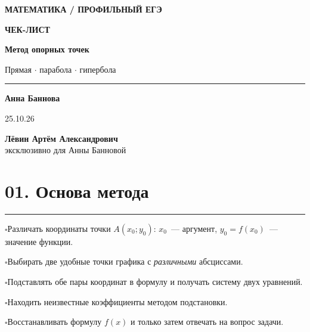 \documentclass[a4paper,12pt]{article}
\newcommand{\checkitem}{\(\square\)\enspace}
\newcommand{\sectionline}{\par\vspace{-4pt}\noindent\textcolor{accent}{\rule{\linewidth}{0.55pt}}\par\vspace{3pt}}
\begin{document}
\thispagestyle{empty}
\begin{center}
\vspace*{23mm}
{\large\textcolor{accent}{\textbf{МАТЕМАТИКА / ПРОФИЛЬНЫЙ ЕГЭ}}}\par\vspace{22mm}
{\fontsize{33}{39}\selectfont\bfseries ЧЕК-ЛИСТ}\par\vspace{11mm}
{\fontsize{22}{28}\selectfont\bfseries Метод опорных точек}\par\vspace{5mm}
{\large Прямая \(\cdot\) парабола \(\cdot\) гипербола}\par
\vspace{19mm}
\textcolor{accent}{\rule{0.58\linewidth}{0.7pt}}\par\vspace{16mm}
{\large\bfseries Анна Баннова}\par\vspace{4mm}
{\normalsize 25.10.26}\par\vspace{11mm}
{\normalsize\textbf{Лёвин Артём Александрович}\\[2mm]
эксклюзивно для Анны Банновой}
\end{center}
\vfill
\begin{center}
\end{center}
\clearpage

\section*{01. Основа метода}
\sectionline
\checkitem Различать координаты точки \(A(x_0;y_0)\): \(x_0\)~--- аргумент, \(y_0=f(x_0)\)~--- значение функции.\par
\checkitem Выбирать две удобные точки графика с \emph{различными} абсциссами.\par
\checkitem Подставлять обе пары координат в формулу и получать систему двух уравнений.\par
\checkitem Находить неизвестные коэффициенты методом подстановки.\par
\checkitem Восстанавливать формулу \(f(x)\) и только затем отвечать на вопрос задачи.\par
\end{document}
